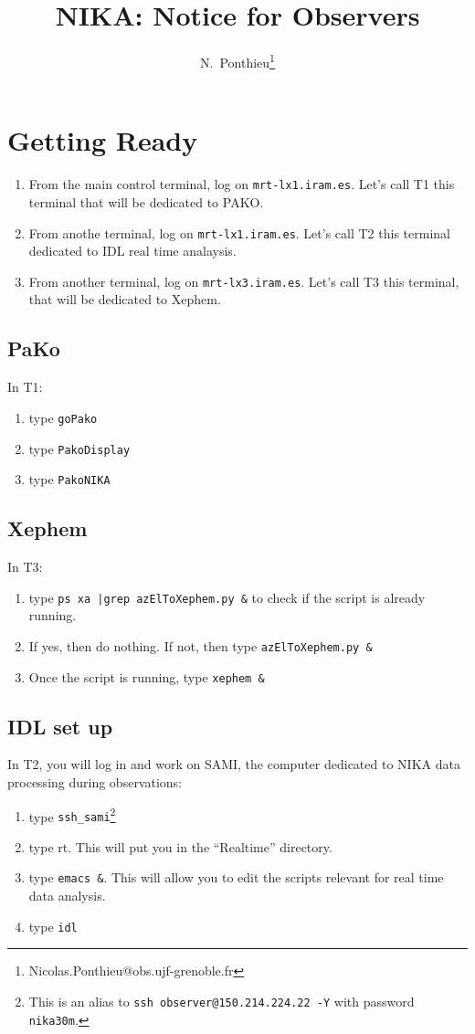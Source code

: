\documentclass[a4paper,10pt]{article}
\title{NIKA: Notice for Observers}
\author{N.~Ponthieu\footnote{Nicolas.Ponthieu@obs.ujf-grenoble.fr}}
\begin{document}
\maketitle


\section{Getting Ready}

\begin{enumerate}
\item From the main control terminal, log on {\tt mrt-lx1.iram.es}. Let's call
  T1 this terminal that will be dedicated to PAKO.
\item From anothe terminal, log on {\tt mrt-lx1.iram.es}. Let's call T2 this
  terminal dedicated to IDL real time analaysis.
\item From another terminal, log on {\tt mrt-lx3.iram.es}. Let's call T3 this
  terminal, that will be dedicated to Xephem.
\end{enumerate}

\subsection{PaKo}
In T1:
\begin{enumerate}
\item type {\tt goPako}
\item type {\tt PakoDisplay}
\item type {\tt PakoNIKA}
\end{enumerate}

\subsection{Xephem}
In T3:
\begin{enumerate}
\item type {\tt ps xa |grep azElToXephem.py \&} to check if the script is
  already running.
\item If yes, then do nothing. If not, then type {\tt azElToXephem.py \&}
\item Once the script is running, type {\tt xephem \&}
\end{enumerate}

\subsection{IDL set up}
In T2, you will log in and work on SAMI, the computer dedicated to NIKA data
processing during observations:
\begin{enumerate}
\item type {\tt ssh\_sami}\footnote{This is an alias to {\tt ssh observer@150.214.224.22 -Y} with password {\tt nika30m}.}
\item type rt. This will put you in the ``Realtime'' directory.
\item type {\tt emacs \&}. This will allow you to edit the scripts
  relevant for real time data analysis.
\item type {\tt idl}
\end{enumerate}
\end{document}
